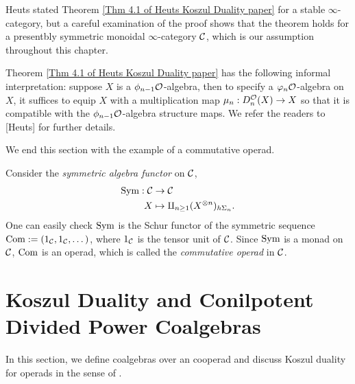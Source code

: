 \begin{remark}
Heuts stated Theorem \ref{Thm 4.1 of Heuts Koszul Duality paper} for a stable $\infty$-category, but a careful examination of the proof shows that the theorem holds for a presentbly symmetric monoidal $\infty$-category ${\mathcal{C}}$, which is our assumption throughout this chapter.
\end{remark}

\begin{remark}
Theorem \ref{Thm 4.1 of Heuts Koszul Duality paper} has the following informal interpretation: suppose $X$ is a $\phi_{n-1}{\mathcal{O}}$-algebra, then to specify a $\varphi_n{\mathcal{O}}$-algebra on $X$, it suffices to equip $X$ with a multiplication map $\mu_n: D^{{\mathcal{O}}}_n(X)\to X$ so that it is compatible with the $\phi_{n-1}{\mathcal{O}}$-algebra structure maps. We refer the readers to [Heuts] for further details.
\end{remark}

We end this section with the example of a commutative operad.
\begin{example}
	Consider the \emph{symmetric algebra functor} on ${\mathcal{C}}$,
	\begin{align*}
		\operatorname{Sym}:{\mathcal{C}} & \to  {\mathcal{C}}\\
		X & \mapsto \amalg_{n\geq 1} (X^{\otimes n})_{h\Sigma_n}.
	\end{align*}
	One can easily check $\operatorname{Sym}$ is the Schur functor of the symmetric sequence $\operatorname{Com}:=(1_{\mathcal{C}},1_{\mathcal{C}},\dots)$, where $1_{\mathcal{C}}$ is the tensor unit of ${\mathcal{C}}$.
	Since $\operatorname{Sym}$ is a monad on ${\mathcal{C}}$, $\operatorname{Com}$ is an operad, which is called the \emph{commutative operad} in ${\mathcal{C}}$.
\end{example}



\section{Koszul Duality and Conilpotent Divided Power Coalgebras }
\label{Coalgebras over cooperads and Koszul Duality}
In this section, we define coalgebras over an cooperad and discuss Koszul duality for operads in the sense of \cite{Ginzburg-Kapranov}. 

